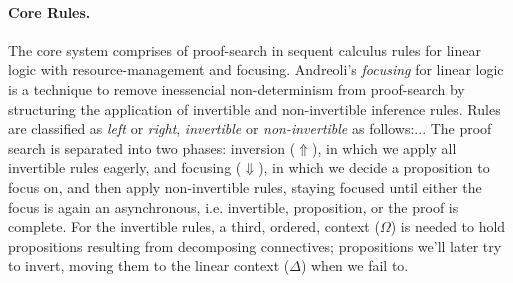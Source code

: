 \documentclass{llncs}
\newcommand{\mypara}[1]{\paragraph{\textbf{#1}.}}
\begin{document}
\mypara{Core Rules} The core system comprises of proof-search in sequent
calculus rules for linear logic with resource-management and focusing.
%
Andreoli's \emph{focusing} for linear logic~\cite{Andreolli
focusing} is a technique to remove inessencial non-determinism from
proof-search by structuring the application of invertible and non-invertible
inference rules. Rules are classified as \emph{left} or \emph{right},
\emph{invertible} or \emph{non-invertible} as follows:...
The proof search is separated into two phases:
%
inversion ($\Uparrow$), in which we apply all invertible rules eagerly, and
focusing ($\Downarrow$), in which we decide a proposition to focus on, and then
apply non-invertible rules, staying focused until either the focus is again an
asynchronous, i.e. invertible, proposition, or the proof is complete.  For the
invertible rules, a third, ordered, context ($\Omega$) is needed to hold
propositions resulting from decomposing connectives; propositions we'll later
try to invert, moving them to the linear context ($\Delta$) when we fail to.

%
\end{document}
